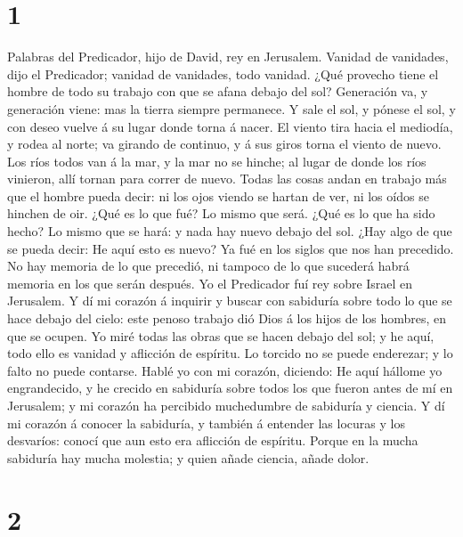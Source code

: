 \hypertarget{section}{%
\section{1}\label{section}}

 Palabras del Predicador, hijo de David, rey en Jerusalem.
 Vanidad de vanidades, dijo el Predicador; vanidad de
vanidades, todo vanidad.  ¿Qué provecho tiene el hombre de
todo su trabajo con que se afana debajo del sol?  Generación
va, y generación viene: mas la tierra siempre permanece.  Y
sale el sol, y pónese el sol, y con deseo vuelve á su lugar donde torna
á nacer.  El viento tira hacia el mediodía, y rodea al
norte; va girando de continuo, y á sus giros torna el viento de nuevo.
 Los ríos todos van á la mar, y la mar no se hinche; al
lugar de donde los ríos vinieron, allí tornan para correr de nuevo.
 Todas las cosas andan en trabajo más que el hombre pueda
decir: ni los ojos viendo se hartan de ver, ni los oídos se hinchen de
oir.  ¿Qué es lo que fué? Lo mismo que será. ¿Qué es lo que
ha sido hecho? Lo mismo que se hará: y nada hay nuevo debajo del sol.
 ¿Hay algo de que se pueda decir: He aquí esto es nuevo? Ya
fué en los siglos que nos han precedido.  No hay memoria de
lo que precedió, ni tampoco de lo que sucederá habrá memoria en los que
serán después.  Yo el Predicador fuí rey sobre Israel en
Jerusalem.  Y dí mi corazón á inquirir y buscar con
sabiduría sobre todo lo que se hace debajo del cielo: este penoso
trabajo dió Dios á los hijos de los hombres, en que se ocupen.
 Yo miré todas las obras que se hacen debajo del sol; y he
aquí, todo ello es vanidad y aflicción de espíritu.  Lo
torcido no se puede enderezar; y lo falto no puede contarse.
 Hablé yo con mi corazón, diciendo: He aquí hállome yo
engrandecido, y he crecido en sabiduría sobre todos los que fueron antes
de mí en Jerusalem; y mi corazón ha percibido muchedumbre de sabiduría y
ciencia.  Y dí mi corazón á conocer la sabiduría, y también
á entender las locuras y los desvaríos: conocí que aun esto era
aflicción de espíritu.  Porque en la mucha sabiduría hay
mucha molestia; y quien añade ciencia, añade dolor.

\hypertarget{section-1}{%
\section{2}\label{section-1}}


